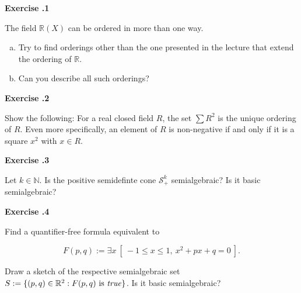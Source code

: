 \documentclass{imo_en}
\newcommand{\R}{\mathbb{R}}
\newcommand{\N}{\mathbb{N}}
\newcommand{\PSD}{\mathcal{S}}
\newcommand{\set}[1]{\{#1\}}
\begin{document}
\maketitle


{\large \textbf{Exercise \thesheetnumber .1}} \bigskip 

The field $\R(X)$ can be ordered in more than one way.
\begin{enumerate}[a)]
	\item Try to find orderings other than the one presented in the lecture that extend the ordering of $\R$. 
	\item Can you describe all such orderings?
\end{enumerate} 

\bigskip


{\large \textbf{Exercise \thesheetnumber .2}} \bigskip 

Show the following: For a real closed field $R$, the set $\sum R^2$ is the
unique ordering of $R$. Even more specifically, an element of $R$ is non-negative if and
only if it is a square $x^2$ with $x \in R$.

\bigskip


{\large \textbf{Exercise \thesheetnumber .3}} \bigskip 

Let $k \in \N$. Is the positive semidefinte cone $\PSD^k_+$ semialgebraic? Is it basic semialgebraic?

\bigskip


{\large \textbf{Exercise \thesheetnumber .4}} \bigskip 

Find a quantifier-free formula equivalent to

$$ F(p, q) := \exists x~[~-1 \leq x \leq 1,~ x^2 + px + q = 0~].$$

Draw a sketch of the respective semialgebraic set $S :=  \set{(p, q) \in \R^2 : F(p, q) \text { is \emph{true}} }$. Is it basic semialgebraic?



%
\end{document}
